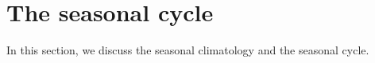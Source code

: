 \documentclass[authoryear,review,11pt]{elsarticle}
\newcommand{\chla}{chl-{\emph{a}}}
\begin{document}

\section{The seasonal cycle}
\label{sec:seasonal}

In this section, we discuss the seasonal climatology and the seasonal cycle.    

%
\end{document}
